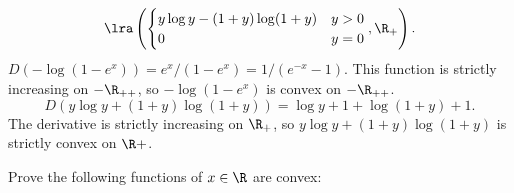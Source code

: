 \documentclass[../borwein-lewis_notes.tex]{subfiles}
\begin{document}
{\begin{enumerate}
\begin{equation*}
\lra\left(\begin{cases} y\log y - (1+y)\log(1+y) & y>0 \\
0 & y=0\end{cases}, \R_+\right).
\end{equation*}
$D(-\log(1-e^x)) = e^x/(1-e^x) = 1/(e^{-x}-1)$. This function is strictly
increasing on $-\R_{++}$, so $-\log(1-e^x)$ is convex on $-\R_{++}$. \\
\begin{equation*}
D(y\log y +(1+y)\log(1+y)) = \log y + 1 + \log(1+y) + 1.
\end{equation*}
The derivative is strictly increasing on $\R_+$, so $y\log y + (1+y)
\log(1+y)$ is strictly convex on $\R+$.
\end{enumerate}
}
\noindent
{}
Prove the following functions 
of $x\in\R$ are convex:
\end{document}
